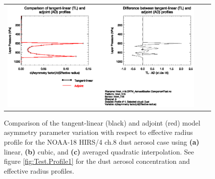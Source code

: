 \begin{figure}[htp]
\begin{tabular}{c c c}
    \includegraphics[bb=90 400 300 540,clip,scale=0.7]{graphics/Aerosol/AD/hirs4_n18.ch8.DUST.NCUBIC.dg_dReff.eps} \\
  \end{tabular}
  \caption{Comparison of the tangent-linear (black) and adjoint (red) model asymmetry parameter variation with respect to effective radius profile for the NOAA-18 HIRS/4 ch.8 dust aerosol case using \textbf{(a)} linear, \textbf{(b)} cubic, and \textbf{(c)} averaged quadratic interpolation. See figure \ref{fig:Test.Profile1} for the dust aerosol concentration and effective radius profiles.}
  \label{fig:hirs4_n18.ch8.DUST.dg_dReff.AD}
\end{figure}

